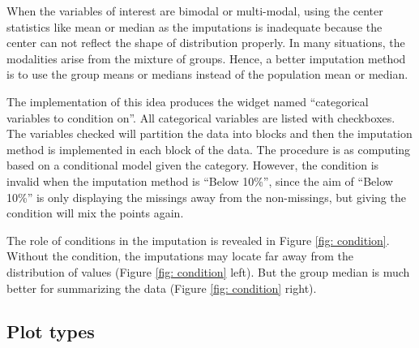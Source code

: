 \documentclass[article]{jss}
\begin{document}
When the variables of interest are bimodal or multi-modal, using the center statistics like mean or median as the imputations is inadequate because the center can not reflect the shape of distribution properly. In many situations, the modalities arise from the mixture of groups. Hence, a better imputation method is to use the group means or medians instead of the population mean or median.

The implementation of this idea produces the widget named ``categorical variables to condition on''. All categorical variables are listed with checkboxes. The variables checked will partition the data into blocks and then the imputation method is implemented in each block of the data. The procedure is as computing based on a conditional model given the category. However, the condition is invalid when the imputation method is ``Below 10\%'', since the aim of ``Below 10\%'' is only displaying the missings away from the non-missings, but giving the condition will mix the points again.

The role of conditions in the imputation is revealed in Figure \ref{fig: condition}. Without the condition, the imputations may locate far away from the distribution of values (Figure \ref{fig: condition} left). But the group median is much better for summarizing the data (Figure \ref{fig: condition} right).

\subsection{Plot types}
\end{document}
